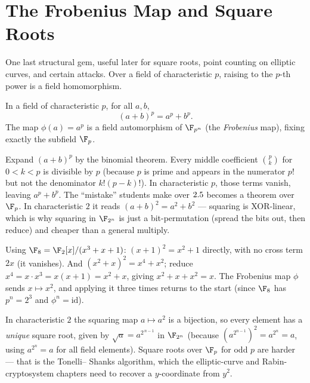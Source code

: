 \section{The Frobenius Map and Square Roots}
\label{ch06:frobenius}

One last structural gem, useful later for square roots, point counting on
elliptic curves, and certain attacks. Over a field of characteristic $p$,
raising to the $p$-th power is a field homomorphism.

\begin{theorem}
\label{ch06:thm-frobenius}
In a field of characteristic $p$, for all $a,b$,
\[
(a+b)^p = a^p + b^p.
\]
The map $\phi(a) = a^p$ is a field automorphism of $\F_{p^n}$ (the
\emph{Frobenius} map), fixing exactly the subfield $\F_p$.
\end{theorem}

\begin{whybox}
Expand $(a+b)^p$ by the binomial theorem. Every middle coefficient
$\binom{p}{k}$ for $0<k<p$ is divisible by $p$ (because $p$ is prime and
appears in the numerator $p!$ but not the denominator $k!(p-k)!$). In
characteristic $p$, those terms vanish, leaving $a^p + b^p$. The
``mistake'' students make over $2.5$ becomes a theorem over $\F_p$. In
characteristic $2$ it reads $(a+b)^2 = a^2+b^2$ --- squaring is XOR-linear,
which is why squaring in $\F_{2^n}$ is just a bit-permutation (spread the bits
out, then reduce) and cheaper than a general multiply.
\end{whybox}

\begin{example}
\label{ch06:ex-square}
Using $\F_8 = \F_2[x]/(x^3+x+1)$: $(x+1)^2 = x^2 + 1$ directly, with no cross
term $2x$ (it vanishes). And $(x^2+x)^2 = x^4 + x^2$; reduce $x^4 = x\cdot x^3
= x(x+1) = x^2 + x$, giving $x^2 + x + x^2 = x$. The Frobenius map $\phi$
sends $x \mapsto x^2$, and applying it three times returns to the start
(since $\F_8$ has $p^n = 2^3$ and $\phi^n = \mathrm{id}$).
\end{example}

\begin{connectionbox}
In characteristic $2$ the squaring map $a\mapsto a^2$ is a bijection, so
every element has a \emph{unique} square root, given by
$\sqrt{a} = a^{2^{\,n-1}}$ in $\F_{2^n}$ (because
$(a^{2^{n-1}})^2 = a^{2^n} = a$, using $a^{2^n}=a$ for all field elements).
Square roots over $\F_p$ for odd $p$ are harder --- that is the Tonelli--
Shanks algorithm, which the elliptic-curve and Rabin-cryptosystem chapters
need to recover a $y$-coordinate from $y^2$.
\end{connectionbox}

